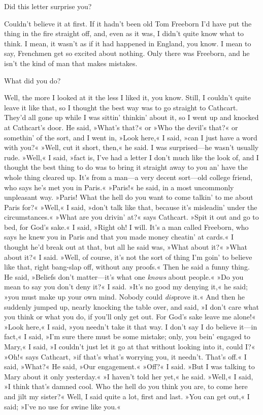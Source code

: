 \begin{dialogue}
 Did this letter surprise you?

 Couldn't believe it at first. If it hadn't been old Tom Freeborn I'd have put the thing in the fire straight off, and, even as it was, I didn't quite know what to think. I mean, it wasn't as if it had happened in England, you know. I mean to say, Frenchmen get so excited about nothing. Only there was Freeborn, and he isn't the kind of man that makes mistakes.

 What did you do?

 Well, the more I looked at it the less I liked it, you know. Still, I couldn't quite leave it like that, so I thought the best way was to go straight to Cathcart. They'd all gone up while I was sittin' thinkin' about it, so I went up and knocked at Cathcart's door.  He said, »What's that?« or »Who the devil's that?« or somethin' of the sort, and I went in, »Look here,« I said, »can I just have a word with you?« »Well, cut it short, then,« he said. I was surprised\allowbreak---\allowbreak he wasn't usually rude. »Well,« I said, »fact is, I've had a letter I don't much like the look of, and I thought the best thing to do was to bring it straight away to you an' have the whole thing cleared up. It's from a man\allowbreak---\allowbreak a very decent sort\allowbreak---\allowbreak old college friend, who says he's met you in Paris.« »Paris!« he said, in a most uncommonly unpleasant way. »Paris!  What the hell do you want to come talkin' to me about Paris for?« »Well,« I said, »don't talk like that, because it's misleadin' under the circumstances.« »What are you drivin' at?« says Cathcart. »Spit it out and go to bed, for God's sake.« I said, »Right oh! I will. It's a man called Freeborn, who says he knew you in Paris and that you made money cheatin' at cards.« I thought he'd break out at that, but all he said was, »What about it?« »What about it?« I said. »Well, of course, it's not the sort of thing I'm goin' to believe like that, right bang-slap off, without any proofs.« Then he said a funny thing. He said, »Beliefs don't matter\allowbreak---\allowbreak it's what one \textit{knows} about people.« »Do you mean to say you don't deny it?« I said. »It's no good my denying it,« he said; »you must make up your own mind. Nobody could \textit{dis}prove it.« And then he suddenly jumped up, nearly knocking the table over, and said, »I don't care what you think or what you do, if you'll only get out. For God's sake leave me alone!« »Look here,« I said, »you needn't take it that way. I don't say I do believe it\allowbreak---\allowbreak in fact,« I said, »I'm sure there must be some mistake; only, you bein' engaged to Mary,« I said, »I couldn't just let it go at that without looking into it, could I?« »Oh!« says Cathcart, »if that's what's worrying you, it needn't. That's off.« I said, »What?« He said, »Our engagement.« »Off?« I said. »But I was talking to Mary about it only yesterday.« »I haven't told her yet,« he said. »Well,« I said, »I think that's damned cool.  Who the hell do you think you are, to come here and jilt my sister?« Well, I said quite a lot, first and last. »You can get out,« I said; »I've no use for swine like you.« 
\end{dialogue}
